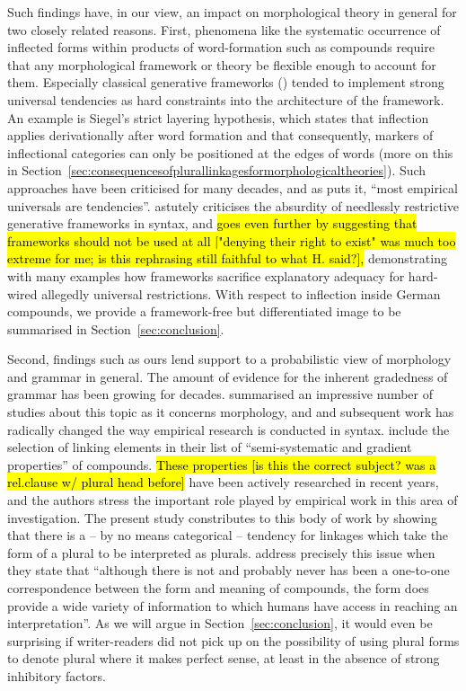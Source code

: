 Such findings have, in our view, an impact on morphological theory in general for two closely related reasons.
First, phenomena like the systematic occurrence of inflected forms within products of word-formation such as compounds require that any morphological framework or theory be flexible enough to account for them.
Especially classical generative frameworks (\egg \citealt{Siegel1979,Mohanan1986,Anderson1992,Pinker1999}) tended to implement strong universal tendencies as hard constraints into the architecture of the framework.
An example is Siegel's strict layering hypothesis, which states that inflection applies derivationally after word formation and that consequently, markers of inflectional categories can only be positioned at the edges of words (more on this in Section~\ref{sec:consequencesofplurallinkagesformorphologicaltheories}).
Such approaches have been criticised for many decades, and as \textcite[391]{Haspelmath2010} puts it, ``most empirical universals are tendencies''.
\textcite{Pollard1996} astutely criticises the absurdity of needlessly restrictive generative frameworks in syntax, and \textcite{Haspelmath2010} \hl{goes even further by suggesting that frameworks should not be used at all ["denying their right to exist" was much too extreme for me; is this rephrasing still faithful to what H. said?],} demonstrating with many examples how frameworks sacrifice explanatory adequacy for hard-wired allegedly universal restrictions.
With respect to inflection inside German compounds, we provide a framework-free but differentiated image to be summarised in Section~\ref{sec:conclusion}.

Second, findings such as ours lend support to a probabilistic view of morphology and grammar in general.
The amount of evidence for the inherent gradedness of grammar has been growing for decades.
\textcite{HayBaayen2005} summarised an impressive number of studies about this topic as it concerns morphology, and \textcite{Bresnan2007} and subsequent work has radically changed the way empirical research is conducted in syntax.
\textcite[105]{ArndtlappeEa2016} include the selection of linking elements in their list of ``semi-systematic and gradient properties'' of compounds.
\hl{These properties [is this the correct subject? was a rel.clause w/ plural head before]} have been actively researched in recent years, and the authors stress the important role played by empirical work in this area of investigation.
The present study constributes to this body of work by showing that there is a -- by no means categorical -- tendency for linkages which take the form of a plural to be interpreted as plurals.
\textcite[107]{ArndtlappeEa2016} address precisely this issue when they state that ``although there is not and probably never has been a one-to-one correspondence between the form and meaning of compounds, the form does provide a wide variety of information to which humans have access in reaching an interpretation''.
As we will argue in Section~\ref{sec:conclusion}, it would even be surprising if writer-readers did not pick up on the possibility of using plural forms to denote plural where it makes perfect sense, at least in the absence of strong inhibitory factors.

